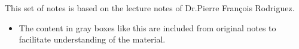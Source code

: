 \thispagestyle{empty}
This set of notes is based on the lecture notes of Dr.Pierre François Rodriguez.  

\begin{unexaminable}
\begin{itemize}
    \item The content in gray boxes like this are included from original notes to facilitate understanding of the material.
\end{itemize}
\end{unexaminable}  

